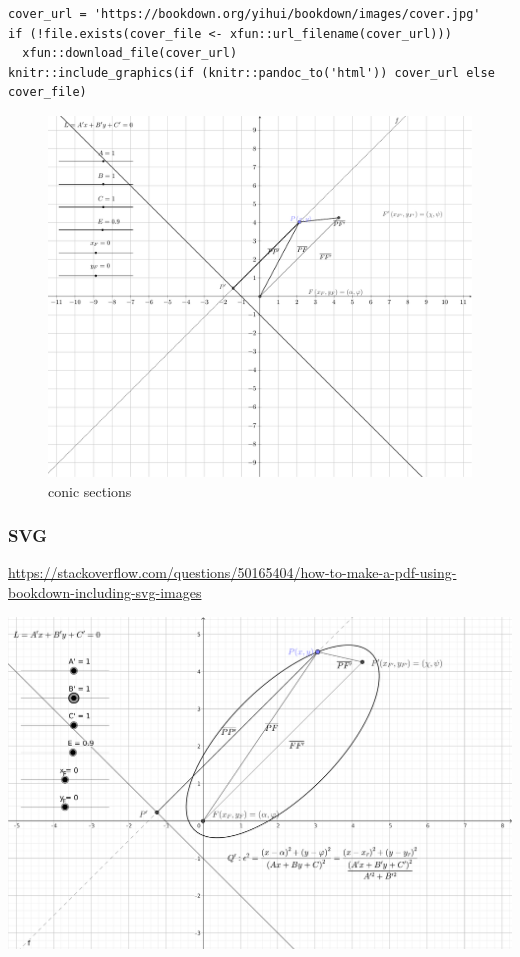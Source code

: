 \documentclass[
]{book}
\theoremstyle{definition}
\theoremstyle{definition}
\theoremstyle{definition}
\theoremstyle{definition}
\theoremstyle{remark}
\begin{document}
\begin{verbatim}
cover_url = 'https://bookdown.org/yihui/bookdown/images/cover.jpg'
if (!file.exists(cover_file <- xfun::url_filename(cover_url)))
  xfun::download_file(cover_url)
knitr::include_graphics(if (knitr::pandoc_to('html')) cover_url else cover_file)
\end{verbatim}

\begin{figure}
\includegraphics[width=0.75\linewidth]{202401280001-test_files/figure-latex/unnamed-chunk-24-1} \caption{conic sections}\label{fig:unnamed-chunk-24}
\end{figure}

\subsubsection{SVG}\label{svg}

\url{https://stackoverflow.com/questions/50165404/how-to-make-a-pdf-using-bookdown-including-svg-images}

\includegraphics{img/conic-sections.pdf}
\end{document}
